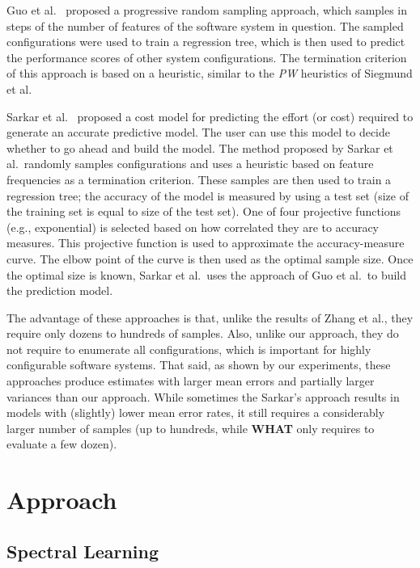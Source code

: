 \documentclass{sig-alternative}
\newcommand{\what}{{\bf WHAT }}
\begin{document}
Guo et al.~\cite{guo2013variability} proposed a progressive random sampling approach, which samples in steps of the number of features of the software system in question. The sampled configurations were used to train a regression tree, which is then used to predict the performance scores of other system configurations. The termination criterion of this approach is based on a heuristic, similar to the {\em PW} heuristics of Siegmund et al. 

Sarkar et al.~\cite{sarkar2015cost} proposed a cost model for predicting the effort (or cost) required to generate an accurate predictive model. The user can use this model to decide whether to go ahead and build the model. The method proposed by Sarkar et al.\ randomly samples configurations and uses a heuristic based on feature frequencies as a termination criterion. These samples are then used to train a regression tree; the accuracy of the model is measured by using a test set (size of the training set is equal to size of the test set). One of four projective functions (e.g., exponential) is selected based on how correlated they are to  accuracy measures. This projective function is used to approximate the accuracy-measure curve. The elbow point of the curve is then used as the optimal sample size. Once the optimal size is known, Sarkar et al.\ uses the approach of Guo et al.\ to build the prediction model.  


The advantage of these approaches is that, unlike  the results of Zhang et al., they require only dozens to hundreds of samples. Also, unlike our approach, they do not require to enumerate all configurations, which is important for highly configurable software systems. 
That said, as shown by our experiments, these approaches produce estimates with  larger mean errors and partially larger variances than our approach. While sometimes the Sarkar's approach results in  models with (slightly)
lower mean error rates, it still requires a considerably larger number of samples (up to hundreds, while \what only requires to evaluate a  few dozen).
 
 \section{Approach}

\subsection{Spectral Learning}\label{sect:spect}
\end{document}
